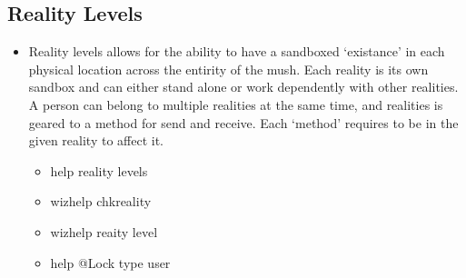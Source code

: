 \documentclass[letterpaper,10pt,english]{sphinxmanual}
\begin{document}
\subsection{Reality Levels}
\label{\detokenize{features:reality-levels}}\begin{itemize}
\item {} 
\sphinxAtStartPar
Reality levels allows for the ability to have a sandboxed ‘existance’
in each physical location across the entirity of the mush.  Each
reality is its own sandbox and can either stand alone or work
dependently with other realities.  A person can belong to multiple
realities at the same time, and realities is geared to a method for
send and receive.  Each ‘method’ requires to be in the given reality
to affect it.
\begin{itemize}
\item {} 
\sphinxAtStartPar
help reality levels

\item {} 
\sphinxAtStartPar
wizhelp chkreality

\item {} 
\sphinxAtStartPar
wizhelp reaity level

\item {} 
\sphinxAtStartPar
help @Lock type user

\end{itemize}

\end{itemize}
\end{document}
